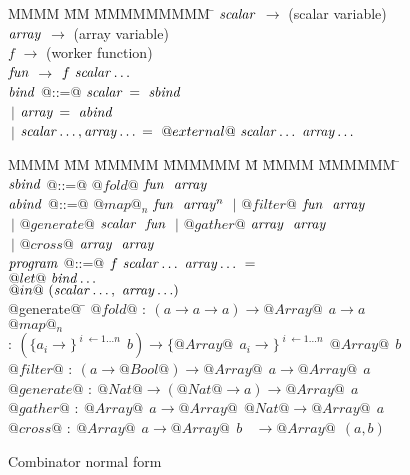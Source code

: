 \begin{figure}
\begin{tabbing}
MMMM        \= MM \= MMMMMMMMM \= \kill
$\mathit{scalar}$    \> $\to$ \> (scalar variable) \\
$\mathit{array}$     \> $\to$ \> (array variable)  \\
$f$         \> $\to$ \> (worker function) \\
$\mathit{fun}$       \> $\to$ \> $f~\mathit{scalar}\ldots$
\\[2ex]
$\mathit{bind}$      \> @::=@ \> $\mathit{scalar}$ \> $=~\mathit{sbind}$ \\
            \> $~|$  \> $\mathit{array}$  \> $=~\mathit{abind}$ \\
            \> $~|$  \> $\mathit{scalar}\ldots,\mathit{array}\ldots$ \> $=~@external@~\mathit{scalar}\ldots~\mathit{array}\ldots$
\end{tabbing}

\begin{tabbing}
MMMM        \= MM \= MMMMM \= MMMMMM \= M \= MMMM \= MMMMMM \= \kill
$\mathit{sbind}$     \> @::=@ \> $@fold@$     \> $\mathit{fun}~~ \mathit{array}$
\\[1ex]

$\mathit{abind}$     \> @::=@ \> $@map@_n$    \> $\mathit{fun}~~ \mathit{array}^n$ 
            \> $~|$  \> $@filter@$   \> $\mathit{fun}~~ \mathit{array}$   \\
            \> $~|$  \> $@generate@$ \> $\mathit{scalar}~~ \mathit{fun}$  
            \> $~|$  \> $@gather@$   \> $\mathit{array}~~ \mathit{array}$ \\
            \> $~|$  \> $@cross@$    \> $\mathit{array}~~ \mathit{array}$
\\[1ex]
$\mathit{program}$  \> @::=@ \> $f~\mathit{scalar}\ldots~\mathit{array}\ldots~=$ \\
            \>          \> $@let@~\mathit{bind}\ldots$                  \\
            \>          \> $@in@~(\mathit{scalar}\ldots,~\mathit{array}\ldots)$
\\[3ex]
@generate@ \= \kill
$@fold@$     \> $:~ (a \to a \to a) \to @Array@~~ a \to a$     \\
$@map@_n$    \> $:~ (\{a_i          \to\}^{\;i\; \gets 1 \dots n}~~ b)  \to
                       \{@Array@~~ a_i \to\}^{\;i\; \gets 1 \dots n}~~ @Array@~~ b$ \\
$@filter@$   \> $:~ (a \to @Bool@) \to @Array@~~ a \to @Array@~~ a$      \\
$@generate@$ \> $:~ @Nat@ \to (@Nat@ \to a) \to @Array@~~ a$          \\
$@gather@$   \> $:~ @Array@~~ a \to @Array@~~ @Nat@  \to @Array@~~ a$ \\
$@cross@$    \> $:~ @Array@~~ a \to @Array@~~ b ~~~~ \to @Array@~~ (a, b)$
\end{tabbing}
\caption{Combinator normal form}
\label{clustering:f:CombinatorNormalForm}
\end{figure}

